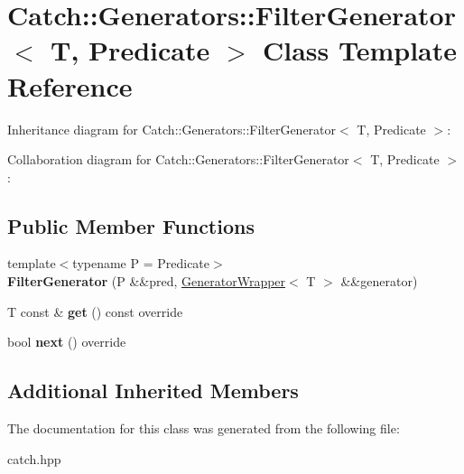 \hypertarget{classCatch_1_1Generators_1_1FilterGenerator}{}\section{Catch\+:\+:Generators\+:\+:Filter\+Generator$<$ T, Predicate $>$ Class Template Reference}
\label{classCatch_1_1Generators_1_1FilterGenerator}


Inheritance diagram for Catch\+:\+:Generators\+:\+:Filter\+Generator$<$ T, Predicate $>$\+:


Collaboration diagram for Catch\+:\+:Generators\+:\+:Filter\+Generator$<$ T, Predicate $>$\+:
\subsection*{Public Member Functions}
\begin{DoxyCompactItemize}
\item 
\mbox{\label{classCatch_1_1Generators_1_1FilterGenerator_aa16886a5e41cbd3b6ffa3dd52388a3a1}} 
{\footnotesize template$<$typename P  = Predicate$>$ }\\{\bfseries Filter\+Generator} (P \&\&pred, \hyperlink{classCatch_1_1Generators_1_1GeneratorWrapper}{Generator\+Wrapper}$<$ T $>$ \&\&generator)
\item 
\mbox{\label{classCatch_1_1Generators_1_1FilterGenerator_ab30e81b61a77430661d40f814758f6fe}} 
T const  \& {\bfseries get} () const override
\item 
\mbox{\label{classCatch_1_1Generators_1_1FilterGenerator_a02ce0839dcaa7545c55d0fe70cc50e84}} 
bool {\bfseries next} () override
\end{DoxyCompactItemize}
\subsection*{Additional Inherited Members}


The documentation for this class was generated from the following file\+:\begin{DoxyCompactItemize}
\item 
catch.\+hpp\end{DoxyCompactItemize}

